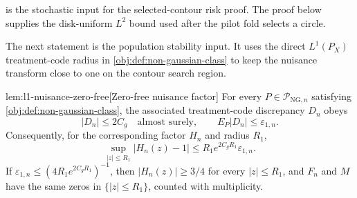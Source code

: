\documentclass[11pt]{article}
\begin{document}
 is the stochastic input for the selected-contour risk proof. The proof below supplies the disk-uniform \(L^2\) bound used after the pilot fold selects a circle.

The next statement is the population stability input. It uses the direct \(L^1(P_X)\) treatment-code radius in \cref{obj:def:non-gaussian-class} to keep the nuisance transform close to one on the contour search region.

\begin{lemmav}{lem:l1-nuisance-zero-free}[Zero-free nuisance factor]
For every \(P\in\mathcal P_{\mathrm{NG},n}\) satisfying \cref{obj:def:non-gaussian-class}, the associated treatment-code discrepancy \(D_n\) obeys
\[
 |D_n|\le 2C_g\quad\text{almost surely},
 \qquad
 E_P|D_n|\le \varepsilon_{1,n}.
\]
Consequently, for the corresponding factor \(H_n\) and radius \(R_1\),
\[
 \sup_{|z|\le R_1}|H_n(z)-1|
 \le R_1 e^{2C_gR_1}\varepsilon_{1,n}.
\]
If \(\varepsilon_{1,n}\le (4R_1 e^{2C_gR_1})^{-1}\), then \(|H_n(z)|\ge 3/4\) for every \(|z|\le R_1\), and \(F_n\) and \(M\) have the same zeros in \(\{|z|\le R_1\}\), counted with multiplicity.
\end{lemmav}
\end{document}
